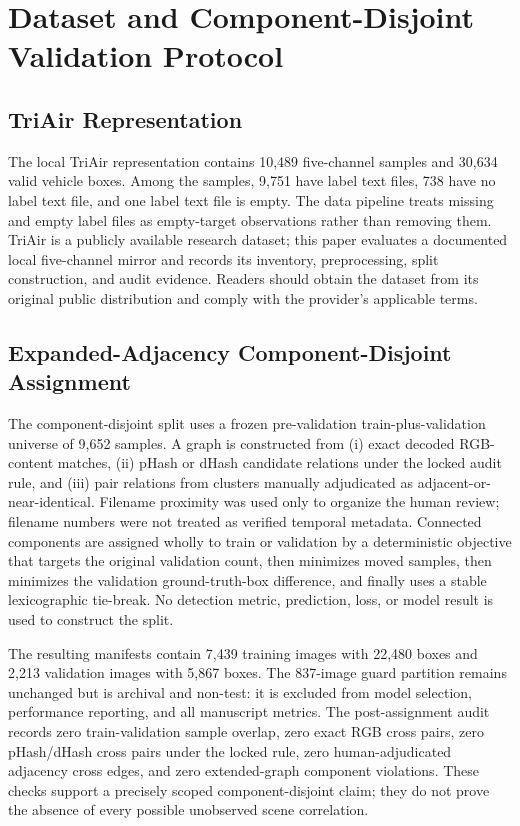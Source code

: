 \section{Dataset and Component-Disjoint Validation Protocol}
\subsection{TriAir Representation}
The local TriAir representation contains 10,489 five-channel samples and 30,634 valid vehicle boxes. Among the samples, 9,751 have label text files, 738 have no label text file, and one label text file is empty. The data pipeline treats missing and empty label files as empty-target observations rather than removing them. TriAir is a publicly available research dataset; this paper evaluates a documented local five-channel mirror and records its inventory, preprocessing, split construction, and audit evidence. Readers should obtain the dataset from its original public distribution and comply with the provider's applicable terms.

\subsection{Expanded-Adjacency Component-Disjoint Assignment}
The component-disjoint split uses a frozen pre-validation train-plus-validation universe of 9,652 samples. A graph is constructed from (i) exact decoded RGB-content matches, (ii) pHash or dHash candidate relations under the locked audit rule, and (iii) pair relations from clusters manually adjudicated as adjacent-or-near-identical. Filename proximity was used only to organize the human review; filename numbers were not treated as verified temporal metadata. Connected components are assigned wholly to train or validation by a deterministic objective that targets the original validation count, then minimizes moved samples, then minimizes the validation ground-truth-box difference, and finally uses a stable lexicographic tie-break. No detection metric, prediction, loss, or model result is used to construct the split.

The resulting manifests contain 7,439 training images with 22,480 boxes and 2,213 validation images with 5,867 boxes. The 837-image guard partition remains unchanged but is archival and non-test: it is excluded from model selection, performance reporting, and all manuscript metrics. The post-assignment audit records zero train-validation sample overlap, zero exact RGB cross pairs, zero pHash/dHash cross pairs under the locked rule, zero human-adjudicated adjacency cross edges, and zero extended-graph component violations. These checks support a precisely scoped component-disjoint claim; they do not prove the absence of every possible unobserved scene correlation.


